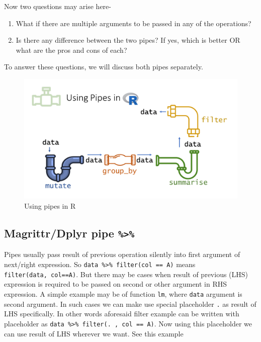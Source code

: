 \documentclass[
]{book}
\providecommand{\tightlist}{%
  \setlength{\itemsep}{0pt}\setlength{\parskip}{0pt}}
\begin{document}
Now two questions may arise here-

\begin{enumerate}
\def\labelenumi{\arabic{enumi}.}
\tightlist
\item
  What if there are multiple arguments to be passed in any of the operations?
\item
  Is there any difference between the two pipes? If yes, which is better OR what are the pros and cons of each?
\end{enumerate}

To answer these questions, we will discuss both pipes separately.

\begin{figure}

{\centering \includegraphics[width=0.99\linewidth]{images/pipes in R} 

}

\caption{Using pipes in R}\label{fig:pipe3}
\end{figure}

\hypertarget{magrittrdplyr-pipe}{%
\subsection{\texorpdfstring{Magrittr/Dplyr pipe \texttt{\%\textgreater{}\%}}{Magrittr/Dplyr pipe \%\textgreater\%}}\label{magrittrdplyr-pipe}}

Pipes usually pass result of previous operation silently into first argument of next/right expression. So \texttt{data\ \%\textgreater{}\%\ filter(col\ ==\ \textquotesingle{}A\textquotesingle{})} means \texttt{filter(data,\ col==\textquotesingle{}A\textquotesingle{})}. But there may be cases when result of previous (LHS) expression is required to be passed on second or other argument in RHS expression. A simple example may be of function \texttt{lm}, where \texttt{data} argument is second argument. In such cases we can make use special placeholder \texttt{.} as result of LHS specifically. In other words aforesaid filter example can be written with placeholder as \texttt{data\ \%\textgreater{}\%\ filter(.\ ,\ col\ ==\ \textquotesingle{}A\textquotesingle{})}. Now using this placeholder we can use result of LHS wherever we want. See this example
\end{document}

